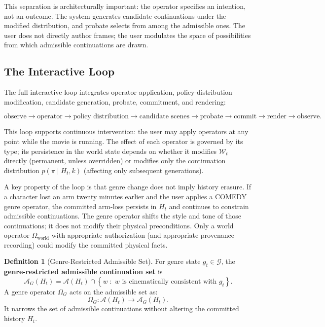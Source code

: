 \documentclass[12pt,a4paper]{article}
\theoremstyle{plain}
\theoremstyle{definition}
\newtheorem{definition}[theorem]{Definition}
\theoremstyle{remark}
\begin{document}
This separation is architecturally important: the operator specifies an intention, not an outcome. The system generates candidate continuations under the modified distribution, and probate selects from among the admissible ones. The user does not directly author frames; the user modulates the space of possibilities from which admissible continuations are drawn.

\subsection{The Interactive Loop}

The full interactive loop integrates operator application, policy-distribution modification, candidate generation, probate, commitment, and rendering:

\[
\text{observe} \to \text{operator} \to \text{policy distribution} \to \text{candidate scenes} \to \text{probate} \to \text{commit} \to \text{render} \to \text{observe}.
\]

This loop supports continuous intervention: the user may apply operators at any point while the movie is running. The effect of each operator is governed by its type; its persistence in the world state depends on whether it modifies $\mathcal{W}_t$ directly (permanent, unless overridden) or modifies only the continuation distribution $p(\pi \mid H_t, k)$ (affecting only subsequent generations).

A key property of the loop is that genre change does not imply history erasure. If a character lost an arm twenty minutes earlier and the user applies a \textsc{COMEDY} genre operator, the committed arm-loss persists in $H_t$ and continues to constrain admissible continuations. The genre operator shifts the style and tone of those continuations; it does not modify their physical preconditions. Only a world operator $\Omega_{\mathrm{world}}$ with appropriate authorization (and appropriate provenance recording) could modify the committed physical facts.

\begin{definition}[Genre-Restricted Admissible Set]
For genre state $g_t \in \mathcal{G}$, the \textbf{genre-restricted admissible continuation set} is
\[
\mathcal{A}_G(H_t) = \mathcal{A}(H_t) \cap \left\{ w \;:\; w \text{ is cinematically consistent with } g_t \right\}.
\]
A genre operator $\Omega_G$ acts on the admissible set as:
\[
\Omega_G : \mathcal{A}(H_t) \to \mathcal{A}_G(H_t).
\]
It narrows the set of admissible continuations without altering the committed history $H_t$.
\end{definition}
\end{document}
